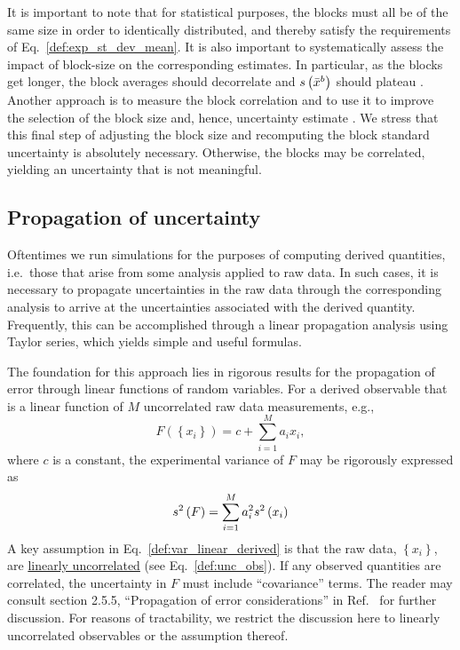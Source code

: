 It is important to note that for statistical purposes, the blocks must all be of the same size in order to identically distributed, and thereby satisfy the requirements of Eq.~\ref{def:exp_st_dev_mean}.  It is also important to  systematically assess the impact of block-size on the corresponding estimates.  In particular, as the blocks get longer, the block averages should decorrelate and $s\left( \bar{x}^b \right)$ should plateau \cite{Flyvbjerg-1989,Grossfield2009}.
Another approach is to measure the block correlation and to use it to improve the selection of the block size and, hence, uncertainty estimate \cite{Kolafa1986}.
We stress that this final step of adjusting the block size and recomputing the block standard uncertainty is absolutely necessary. Otherwise, the blocks may be correlated, yielding an uncertainty that is not meaningful.


\subsection{Propagation of uncertainty}


Oftentimes we run simulations for the purposes of computing derived quantities, i.e.\ those that arise from some analysis applied to raw data.  In such cases, it is necessary to propagate uncertainties in the raw data through the corresponding analysis to arrive at the uncertainties associated with the derived quantity.  Frequently, this can be accomplished through a linear propagation analysis using Taylor series, which yields simple and useful formulas.

The foundation for this approach lies in rigorous results for the propagation of error through linear functions of random variables.
For a derived observable that is a linear function of $M$ uncorrelated raw data measurements, e.g.,
%
\begin{equation}
  F\left( \left\{x_i\right\} \right) = c + \sum_{i=1}^M a_i x_i,
  \label{def:linear_derived_obs}
\end{equation}
%
where $c$ is a constant, the experimental variance of $F$ may be rigorously expressed as\cite{NIST_Sematech_eHandbook}
%
\begin{equation}
  s^2\left( F \right) = \sum_{i=1}^M a_i^2 s^2\left( x_i \right)
  \label{def:var_linear_derived}
\end{equation}
%
A key assumption in Eq.~\ref{def:var_linear_derived} is that the raw data, $\left\{x_i\right\}$, are \hyperref[def:unc_obs]{linearly uncorrelated} (see Eq.~\ref{def:unc_obs}). If any observed quantities are correlated, the uncertainty in $F$ must include ``covariance'' terms. The reader may consult section 2.5.5, ``Propagation of error considerations'' in Ref.~\cite{NIST_Sematech_eHandbook} for further discussion. For reasons of tractability, we restrict the discussion here to linearly uncorrelated observables or the assumption thereof.

